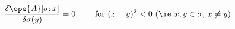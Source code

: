 \begin{equation}	\label{12.33}
\frac{\delta\ope{A}[\sigma;x]}{\delta\sigma(y)} = 0
\qquad
\text{ for $(x-y)^2<0$ (\ie  $x,y\in\sigma$, $x\not=y$)}
	\end{equation}

